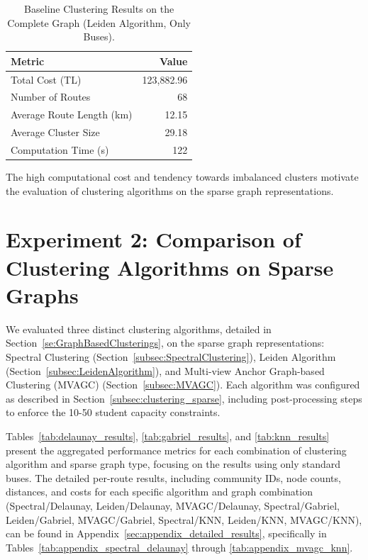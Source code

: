 \begin{table}[h]
\centering
\label{tab:complete_graph_clustering}
\begin{tabular}{lr}
\toprule
Metric & Value \\
\midrule
Total Cost (TL) & 123,882.96 \\
Number of Routes & 68 \\
Average Route Length (km) & 12.15 \\
Average Cluster Size & 29.18 \\
Computation Time (s) & 122 \\
\bottomrule
\end{tabular}
\caption{Baseline Clustering Results on the Complete Graph (Leiden Algorithm, Only Buses).}
\end{table}

The high computational cost and tendency towards imbalanced clusters motivate the evaluation of clustering algorithms on the sparse graph representations.

\section{Experiment 2: Comparison of Clustering Algorithms on Sparse Graphs}
\label{sec:exp_clustering}

We evaluated three distinct clustering algorithms, detailed in Section~\ref{se:GraphBasedClusterings}, on the sparse graph representations: Spectral Clustering (Section~\ref{subsec:SpectralClustering}), Leiden Algorithm (Section~\ref{subsec:LeidenAlgorithm}), and Multi-view Anchor Graph-based Clustering (MVAGC) (Section~\ref{subsec:MVAGC}). Each algorithm was configured as described in Section~\ref{subsec:clustering_sparse}, including post-processing steps to enforce the 10-50 student capacity constraints.

Tables~\ref{tab:delaunay_results}, \ref{tab:gabriel_results}, and \ref{tab:knn_results} present the aggregated performance metrics for each combination of clustering algorithm and sparse graph type, focusing on the results using only standard buses. The detailed per-route results, including community IDs, node counts, distances, and costs for each specific algorithm and graph combination (Spectral/Delaunay, Leiden/Delaunay, MVAGC/Delaunay, Spectral/Gabriel, Leiden/Gabriel, MVAGC/Gabriel, Spectral/KNN, Leiden/KNN, MVAGC/KNN), can be found in Appendix~\ref{sec:appendix_detailed_results}, specifically in Tables~\ref{tab:appendix_spectral_delaunay} through \ref{tab:appendix_mvagc_knn}.

